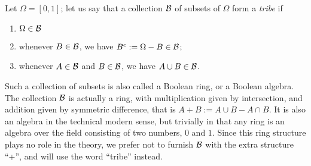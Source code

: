 Let $\Omega=[0,1]$; let us say that a collection ${\cal B}$ of subsets
of $\Omega$ form a {\em tribe} if
\begin{enumerate}
\item $\Omega\in{\cal B}$
\item whenever $B\in{\cal B}$, we have $B^c:=\Omega-B\in{\cal B}$;
\item whenever $A\in{\cal B}$ and $B\in{\cal B}$, we have $A\cup B\in
{\cal B}$.
\end{enumerate}
Such a collection of subsets is also called a Boolean ring, or a Boolean
algebra. The collection ${\cal B}$ is
actually a ring, with multiplication given by intersection, and addition
given by symmetric difference, that is $A+B:=A\cup B-A\cap B$. It is
also an algebra in the technical modern sense, but trivially in that any
ring is an algebra over the field
consisting of two numbers, $0$ and $1$. Since this ring structure plays no
role in the theory, we prefer not to furnish ${\cal B}$ with the extra
structure ``+'', and will use the word ``tribe'' instead.

